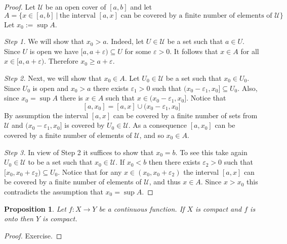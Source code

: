 \documentclass[11pt, letterpaper, oneside]{report}
\theoremstyle{pplain}
\newtheorem{proposition}[theorem]{Proposition}
\newtheorem{ITERMVALUE THM}[theorem]{Intermediate Value Theorem}
\newtheorem{HEINEBOREL THM}[theorem]{Heine-Borel Theorem}
\newtheorem{UMETR THM}[theorem]{Urysohn Metrization Theorem}
\newtheorem{UMETR2 THM}[theorem]{Urysohn Metrization Theorem (v.2)}
\theoremstyle{ddefinition}
\theoremstyle{nnn}
\newtheorem{TDA NN}[theorem]{Topological Data Analysis. }
\theoremstyle{eexercise}
\newcommand{\UU}{{\mathcal U}}
\begin{document}
\begin{proof}
Let $\UU$ be an open cover of $[a, b]$ and let 
$$A = \{x\in [a, b] \ | \  \text{the interval $[a, x]$ can be covered by a finite number of elements of $\UU$}\}$$
Let $x_{0} := \sup A$. 

\emph{Step 1.} We will show that $x_{0} > a$. Indeed, let $U\in \UU$ be a set such that $a\in U$. 
Since $U$ is open we have $[a, a+\varepsilon ) \subseteq U$ for some $\varepsilon > 0$. It follows 
that $x\in A$ for all $x\in [a, a+\varepsilon)$. Therefore $x_{0}\geq a+\varepsilon$. 


\emph{Step 2.} Next, we  will show  that $x_{0}\in A$. Let $U_{0}\in \UU$ be a set such that 
$x_{0}\in U_{0}$. Since $U_{0}$ is open and $x_{0}> a$ there exists $\varepsilon _{1} >0$ such that
$(x_{0}-\varepsilon_{1} , x_{0}] \subseteq U_{0}$. Also, since $x_{0} = \sup A$  there is $x\in A$
such that $x\in (x_{0}-\varepsilon_{1} , x_{0}]$. Notice that  
$$[a, x_{0}] = [a, x]\cup (x_{0}-\varepsilon_{1}, x_{0}]$$
By assumption the interval $[a, x]$ can be covered by a finite number of sets from  $\UU$ and 
$(x_{0}-\varepsilon_{1}, x_{0}]$ is covered by $U_{0}\in \UU$. As a consequence $[a, x_{0}]$
can be covered by a finite number of elements of $\UU$, and so $x_{0}\in A$. 

\emph{Step 3.} In view of Step 2 it suffices to show  that $x_{0} = b$.  To see this take again 
$U_{0}\in \UU$ to be a set such that $x_{0}\in \UU$. If $x_{0}< b$ then there exists $\varepsilon_{2} >0$
such that $[x_{0}, x_{0}+\varepsilon_{2} ) \subseteq U_{0}$. Notice that for any  
$x\in (x_{0}, x_{0}+\varepsilon_{2})$ the interval $[a, x]$ can be covered by a finite number of elements of 
$\UU$, and thus $x\in A$. Since $x> x_{0}$ this contradicts the assumption that $x_{0} = \sup A$.  

\end{proof}


\begin{proposition}
\label{COMPACT ONTO PROP}
Let $f\colon X\to Y$ be a continuous function. If  $X$ is compact and $f$ is onto then $Y$ is compact. 
\end{proposition}

\begin{proof}
Exercise.
\end{proof}
\end{document}

